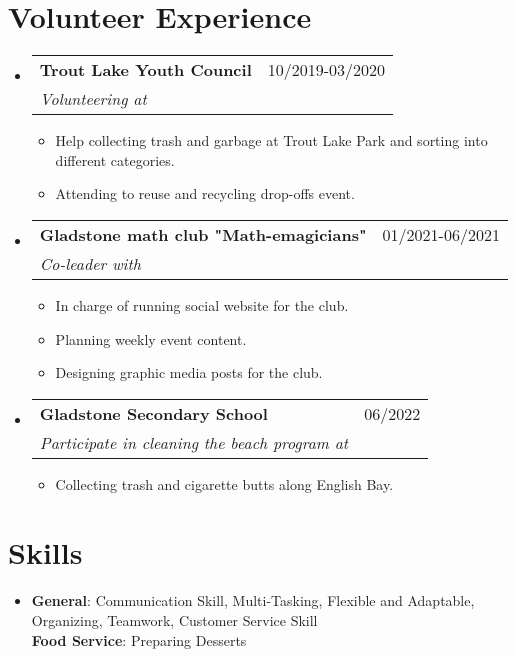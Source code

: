 \documentclass[letterpaper,11pt]{article}
\makeatletter
\newcommand{\resumeItem}[1]{
\item\small{
{#1 \vspace{-2pt}}
}
}
\newcommand{\resumeSubheading}[4]{
\vspace{-2pt}\item
\begin{tabular*}{0.97\textwidth}[t]{l@{\extracolsep{\fill}}r}
\textbf{#1} & #2 \\
\textit{\small#3} & \textit{\small #4} \\
\end{tabular*}\vspace{-7pt}
}
\newcommand{\resumeSubHeadingListStart}{\begin{itemize}[leftmargin=0.15in, label={}]}
\newcommand{\resumeSubHeadingListEnd}{\end{itemize}}
\newcommand{\resumeItemListStart}{\begin{itemize}}
\newcommand{\resumeItemListEnd}{\end{itemize}\vspace{-5pt}}
\makeatother
\begin{document}
\section{Volunteer Experience}
\resumeSubHeadingListStart
\resumeSubheading{Trout Lake Youth Council}{10/2019-03/2020}{Volunteering at}{ }
\resumeItemListStart
\resumeItem{Help collecting trash and garbage at Trout Lake Park and sorting into different categories.}
\resumeItem{Attending to reuse and recycling drop-offs event.}
\resumeItemListEnd
\resumeSubheading{Gladstone math club "Math-emagicians"}{01/2021-06/2021}{Co-leader with}{ }
\resumeItemListStart
\resumeItem{In charge of running social website for the club.}
\resumeItem{Planning weekly event content.}
\resumeItem{Designing graphic media posts for the club.}
\resumeItemListEnd
\resumeSubheading{Gladstone Secondary School}{06/2022}{Participate in cleaning the beach program at}{ }
\resumeItemListStart
\resumeItem{Collecting trash and cigarette butts along English Bay.}
\resumeItemListEnd
\resumeSubHeadingListEnd

\section{Skills} %
\begin{itemize}[leftmargin=0.15in, label={}]
\item{
\textbf{General}{: Communication Skill, Multi-Tasking, Flexible and Adaptable, Organizing, Teamwork, Customer Service Skill} \\
\textbf{Food Service}{: Preparing Desserts}
} \\
\end{itemize}


\end{document}
